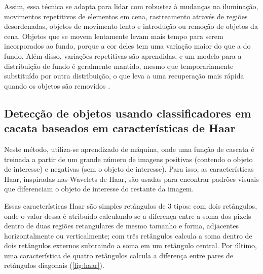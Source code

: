\documentclass[12pt, %
openright, 
oneside, %
a4paper,    %
brazil]{facom-ufu-abntex2}
\begin{document}
Assim, essa técnica se adapta para lidar com robustez à mudanças na iluminação,
movimentos repetitivos de elementos em cena, rastreamento através de regiões
desordenadas, objetos de movimento lento e introdução ou remoção de objetos da
cena. Objetos que se movem lentamente levam mais tempo para serem incorporados
ao fundo, porque a cor deles tem uma variação maior do que a do fundo. Além
disso, variações repetitivas são aprendidas, e um modelo para a distribuição de
fundo é geralmente mantido, mesmo que temporariamente substituído por outra
distribuição, o que leva a uma recuperação mais rápida quando os objetos são
removidos \cite{784637}.

\subsection{Detecção de objetos usando classificadores em cacata baseados em
	características de Haar}

Neste método, utiliza-se aprendizado de máquina, onde uma função de cascata é
treinada a partir de um grande número de imagens positivas (contendo o objeto
de interesse) e negativas (sem o objeto de interesse). Para isso, as
características Haar, inspiradas nas Wavelets de Haar, são usadas para
encontrar padrões visuais que diferenciam o objeto de interesse do restante da
imagem.

Essas características Haar são simples retângulos de 3 tipos: com dois
retângulos, onde o valor dessa é atribuído calculando-se a diferença entre a
soma dos pixels dentro de duas regiões retangulares de mesmo tamanho e forma,
adjacentes horizontalmente ou verticalmente; com três retângulos calcula a soma
dentro de dois retângulos externos subtraindo a soma em um retângulo central.
Por último, uma característica de quatro retângulos calcula a diferença entre
pares de retângulos diagonais (\autoref{fig:haar}).

\end{document}

